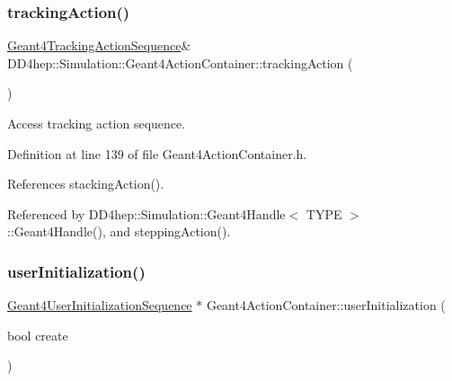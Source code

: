 \hypertarget{class_d_d4hep_1_1_simulation_1_1_geant4_action_container_a39580aa5a9e07279b16b2739efba2608}{}\label{class_d_d4hep_1_1_simulation_1_1_geant4_action_container_a39580aa5a9e07279b16b2739efba2608} 
\subsubsection{\texorpdfstring{tracking\+Action()}{trackingAction()}\hspace{0.1cm}{\footnotesize\ttfamily [2/2]}}
{\footnotesize\ttfamily \hyperlink{class_d_d4hep_1_1_simulation_1_1_geant4_tracking_action_sequence}{Geant4\+Tracking\+Action\+Sequence}\& D\+D4hep\+::\+Simulation\+::\+Geant4\+Action\+Container\+::tracking\+Action (\begin{DoxyParamCaption}{ }\end{DoxyParamCaption})\hspace{0.3cm}{\ttfamily [inline]}}



Access tracking action sequence. 



Definition at line 139 of file Geant4\+Action\+Container.\+h.



References stacking\+Action().



Referenced by D\+D4hep\+::\+Simulation\+::\+Geant4\+Handle$<$ T\+Y\+P\+E $>$\+::\+Geant4\+Handle(), and stepping\+Action().

\hypertarget{class_d_d4hep_1_1_simulation_1_1_geant4_action_container_a04ba4fd85ae343b856d73dcb3cc0e9b3}{}\label{class_d_d4hep_1_1_simulation_1_1_geant4_action_container_a04ba4fd85ae343b856d73dcb3cc0e9b3} 
\subsubsection{\texorpdfstring{user\+Initialization()}{userInitialization()}\hspace{0.1cm}{\footnotesize\ttfamily [1/2]}}
{\footnotesize\ttfamily \hyperlink{class_d_d4hep_1_1_simulation_1_1_geant4_user_initialization_sequence}{Geant4\+User\+Initialization\+Sequence} $\ast$ Geant4\+Action\+Container\+::user\+Initialization (\begin{DoxyParamCaption}\item[{bool}]{create }\end{DoxyParamCaption})}



